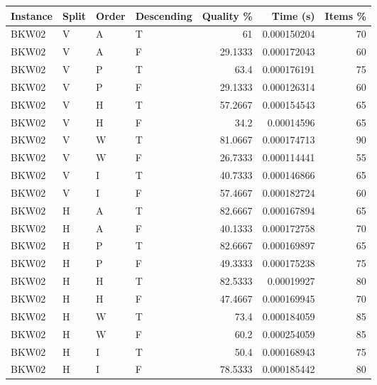 \begin{tabular}{llllrrr}
    \hline
    Instance & Split & Order & Descending & Quality \% & Time (s)    & Items \% \\
    \hline
    BKW02    & V     & A     & T          & 61         & 0.000150204 & 70       \\
    BKW02    & V     & A     & F          & 29.1333    & 0.000172043 & 60       \\
    BKW02    & V     & P     & T          & 63.4       & 0.000176191 & 75       \\
    BKW02    & V     & P     & F          & 29.1333    & 0.000126314 & 60       \\
    BKW02    & V     & H     & T          & 57.2667    & 0.000154543 & 65       \\
    BKW02    & V     & H     & F          & 34.2       & 0.00014596  & 65       \\
    BKW02    & V     & W     & T          & 81.0667    & 0.000174713 & 90       \\
    BKW02    & V     & W     & F          & 26.7333    & 0.000114441 & 55       \\
    BKW02    & V     & I     & T          & 40.7333    & 0.000146866 & 65       \\
    BKW02    & V     & I     & F          & 57.4667    & 0.000182724 & 60       \\
    BKW02    & H     & A     & T          & 82.6667    & 0.000167894 & 65       \\
    BKW02    & H     & A     & F          & 40.1333    & 0.000172758 & 70       \\
    BKW02    & H     & P     & T          & 82.6667    & 0.000169897 & 65       \\
    BKW02    & H     & P     & F          & 49.3333    & 0.000175238 & 75       \\
    BKW02    & H     & H     & T          & 82.5333    & 0.00019927  & 80       \\
    BKW02    & H     & H     & F          & 47.4667    & 0.000169945 & 70       \\
    BKW02    & H     & W     & T          & 73.4       & 0.000184059 & 85       \\
    BKW02    & H     & W     & F          & 60.2       & 0.000254059 & 85       \\
    BKW02    & H     & I     & T          & 50.4       & 0.000168943 & 75       \\
    BKW02    & H     & I     & F          & 78.5333    & 0.000185442 & 80       \\

\end{tabular}
